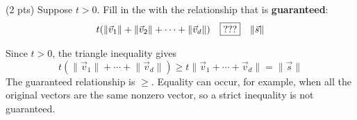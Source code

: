 \documentclass[11pt,twoside]{article}
\begin{document}
\begin{prob}[(11 pts)]
\newpage
\begin{subprob}(2 pts) Suppose $t>0$. Fill in the  with the relationship that is \textbf{guaranteed}:
\[
t(\lVert\vec v_1\rVert+\lVert\vec v_2\rVert+\cdots+\lVert\vec v_d\rVert)
\quad\fbox{???}\quad
\lVert\vec s\rVert
\]
\par\medskip
\bubble{$>$}\quad
\correctbubble{$\geq$}\quad
\bubble{$=$}\quad
\bubble{$<$}\quad
\bubble{$\leq$}

\begin{solution}
Since $t>0$, the triangle inequality gives
\[
t(\lVert\vec v_1\rVert+\cdots+\lVert\vec v_d\rVert)
\geq t\lVert\vec v_1+\cdots+\vec v_d\rVert
=\lVert\vec s\rVert
\]
The guaranteed relationship is $\boxed{\geq}$. Equality can occur, for example, when all the original vectors are the same nonzero vector, so a strict inequality is not guaranteed.
\end{solution}
\end{subprob}
\end{prob}
\end{document}
